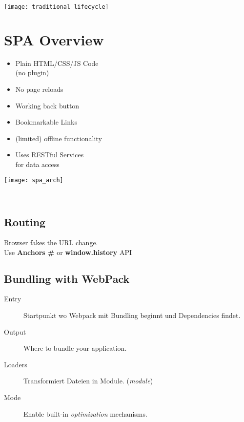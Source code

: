 

\newcommand{\TITLE}{Web Engineering 3}
\newcommand{\AUTHOR}{Mona Panchaud}
\newcommand{\INSTITUTE}{Ostschweizer Fachhochschule}



\begin{multicols*}{4}

\texttt{[image: traditional\_lifecycle]}

\section{SPA Overview}

\begin{minipage}[c]{.6\linewidth}
    \begin{itemize}
        \item Plain HTML/CSS/JS Code \\(no plugin)
        \item No page reloads
        \item Working back button
        \item Bookmarkable Links
        \item (limited) offline functionality
        \item Uses RESTful Services \\for data access
    \end{itemize}
\end{minipage}%
\begin{minipage}[c]{.4\linewidth}
    \texttt{[image: spa\_arch]}
\end{minipage}%
\\ %

\subsection{Routing}
Browser fakes the URL change.
\\
Use \textbf{Anchors \#} or \textbf{window.history} API

\subsection{Bundling with WebPack}
\begin{description}
    \item[Entry] Startpunkt wo Webpack mit Bundling beginnt und
    Dependencies findet.
    \item[Output] Where to bundle your application.
    \item[Loaders] Transformiert Dateien in Module. (\textit{module})
    \item[Mode] Enable built-in \textit{optimization} mechanisms.
\end{description}


\end{multicols*}
